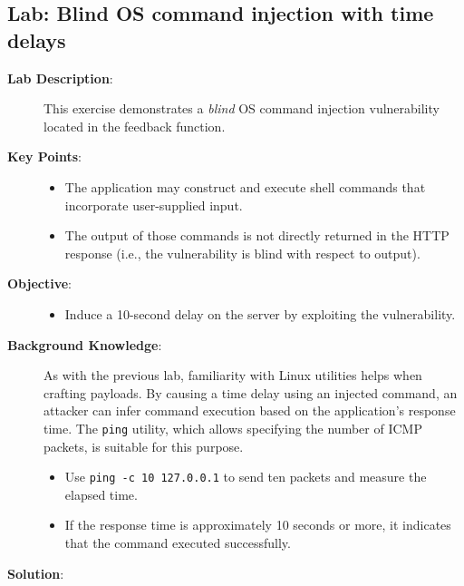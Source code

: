 \documentclass{article}
\begin{document}
\subsection*{Lab: Blind OS command injection with time delays}
\begin{description}
  \item[\textbf{Lab Description}:] This exercise demonstrates a \emph{blind} OS command injection vulnerability located in the feedback function.

  \item[\textbf{Key Points}:]\leavevmode\par
    \begin{itemize}
      \item The application may construct and execute shell commands that incorporate user-supplied input.
      \item The output of those commands is not directly returned in the HTTP response (i.e., the vulnerability is blind with respect to output).
    \end{itemize}

  \item[\textbf{Objective}:]\leavevmode\par
    \begin{itemize}
      \item Induce a 10-second delay on the server by exploiting the vulnerability.
    \end{itemize}

  \item[\textbf{Background Knowledge}:]\leavevmode\par
    As with the previous lab, familiarity with Linux utilities helps when crafting payloads. By causing a time delay using an injected command, an attacker can infer command execution based on the application's response time. The \texttt{ping} utility, which allows specifying the number of ICMP packets, is suitable for this purpose.
    \begin{itemize}
      \item Use \texttt{ping -c 10 127.0.0.1} to send ten packets and measure the elapsed time.
      \item If the response time is approximately 10 seconds or more, it indicates that the command executed successfully.
    \end{itemize}

    \item[\textbf{Solution}:] \leavevmode\par


\end{description}
\end{document}
